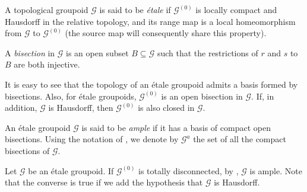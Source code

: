 \documentclass[11pt, a4paper]{amsart}
\newcommand{\G}{\ensuremath {\mathcal{G}}}
\newcommand{\Go}{\ensuremath {\mathcal{G}^{(0)}}}
\newcommand{\Ga}{\ensuremath {\mathcal{G}^{a}}}
\theoremstyle{plain}
\newtheorem{lemma}[theorem]{Lemma}
\begin{document}
A topological groupoid $\G$ is said to be \emph{\'{e}tale} if $\Go$ is locally compact and Hausdorff in the relative topology, and its range map is a local homeomorphism from $\G$ to $\Go$ (the source map will consequently share this property). 

A \emph{bisection} in $\G$ is an open subset $B \subseteq \G$ such that the restrictions of $r$ and $s$ to $B$ are both injective.

It is easy to see that the topology of an \'{e}tale groupoid admits a basis formed by  bisections. Also, for \'{e}tale groupoids, $\Go$ is an open bisection in $\G.$ If, in addition, $\G$ is Hausdorff, then $\Go$ is also closed in $\G.$

An \'{e}tale groupoid $\G$ is said to be \emph{ample} if it has a basis of compact open bisections. Using the notation of \cite{Paterson}, we denote by $\Ga$ the set of all the compact bisections of $\G.$ 

Let $\G$ be an \'{e}tale groupoid. If $\Go$ is totally disconnected, by \cite[Proposition~4.1]{Exel2}, $\G$ is ample. Note that the converse is true if we add the hypothesis that $\G$ is Hausdorff.


\end{document}
